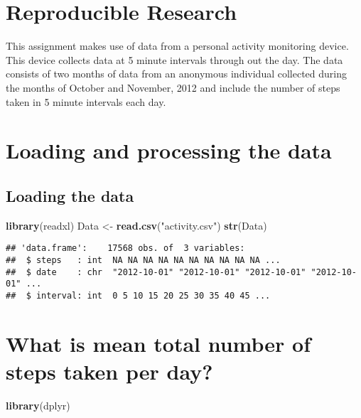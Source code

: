 \documentclass[
]{article}
\author{}
\date{\vspace{-2.5em}}
\newenvironment{Shaded}{\begin{snugshade}}{\end{snugshade}}
\newcommand{\KeywordTok}[1]{\textcolor[rgb]{0.13,0.29,0.53}{\textbf{#1}}}
\newcommand{\NormalTok}[1]{#1}
\newcommand{\StringTok}[1]{\textcolor[rgb]{0.31,0.60,0.02}{#1}}
\begin{document}
\hypertarget{reproducible-research}{%
\section{Reproducible Research}\label{reproducible-research}}

This assignment makes use of data from a personal activity monitoring
device. This device collects data at 5 minute intervals through out the
day. The data consists of two months of data from an anonymous
individual collected during the months of October and November, 2012 and
include the number of steps taken in 5 minute intervals each day.

\hypertarget{loading-and-processing-the-data}{%
\section{Loading and processing the
data}\label{loading-and-processing-the-data}}

\hypertarget{loading-the-data}{%
\subsection{Loading the data}\label{loading-the-data}}

\begin{Shaded}
\begin{Highlighting}[]
\KeywordTok{library}\NormalTok{(readxl)}
\NormalTok{Data <-}\StringTok{ }\KeywordTok{read.csv}\NormalTok{(}\StringTok{"activity.csv"}\NormalTok{)}
\KeywordTok{str}\NormalTok{(Data)}
\end{Highlighting}
\end{Shaded}

\begin{verbatim}
## 'data.frame':    17568 obs. of  3 variables:
##  $ steps   : int  NA NA NA NA NA NA NA NA NA NA ...
##  $ date    : chr  "2012-10-01" "2012-10-01" "2012-10-01" "2012-10-01" ...
##  $ interval: int  0 5 10 15 20 25 30 35 40 45 ...
\end{verbatim}

\hypertarget{what-is-mean-total-number-of-steps-taken-per-day}{%
\section{What is mean total number of steps taken per
day?}\label{what-is-mean-total-number-of-steps-taken-per-day}}

\begin{Shaded}
\begin{Highlighting}[]
\KeywordTok{library}\NormalTok{(dplyr)}
\end{Highlighting}
\end{Shaded}
\end{document}
